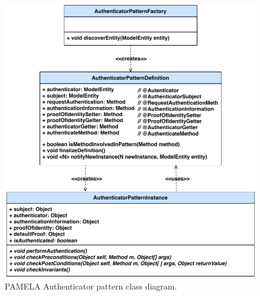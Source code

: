 \begin{figure}
    \centering
    \includegraphics[width=0.8 \columnwidth]{figures/PAMELAAuthenticator_CD.pdf}
    \caption{PAMELA Authenticator pattern class diagram.}
    \label{fig:PAMELAAuthenticatorCD}
\end{figure}


